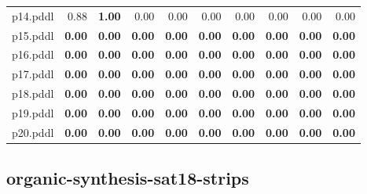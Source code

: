 \documentclass{article}
\begin{document}
\begin{tabular}{@{}lrrrrrrrrr@{}}
p14.pddl & 0.88 & \textbf{1.00} & 0.00 & 0.00 & 0.00 & 0.00 & 0.00 & 0.00 & 0.00 \\
p15.pddl & \textbf{0.00} & \textbf{0.00} & \textbf{0.00} & \textbf{0.00} & \textbf{0.00} & \textbf{0.00} & \textbf{0.00} & \textbf{0.00} & \textbf{0.00} \\
p16.pddl & \textbf{0.00} & \textbf{0.00} & \textbf{0.00} & \textbf{0.00} & \textbf{0.00} & \textbf{0.00} & \textbf{0.00} & \textbf{0.00} & \textbf{0.00} \\
p17.pddl & \textbf{0.00} & \textbf{0.00} & \textbf{0.00} & \textbf{0.00} & \textbf{0.00} & \textbf{0.00} & \textbf{0.00} & \textbf{0.00} & \textbf{0.00} \\
p18.pddl & \textbf{0.00} & \textbf{0.00} & \textbf{0.00} & \textbf{0.00} & \textbf{0.00} & \textbf{0.00} & \textbf{0.00} & \textbf{0.00} & \textbf{0.00} \\
p19.pddl & \textbf{0.00} & \textbf{0.00} & \textbf{0.00} & \textbf{0.00} & \textbf{0.00} & \textbf{0.00} & \textbf{0.00} & \textbf{0.00} & \textbf{0.00} \\
p20.pddl & \textbf{0.00} & \textbf{0.00} & \textbf{0.00} & \textbf{0.00} & \textbf{0.00} & \textbf{0.00} & \textbf{0.00} & \textbf{0.00} & \textbf{0.00} \\
\end{tabular}

\hypertarget{quality-organic-synthesis-sat18-strips}{}
\subsection*{organic-synthesis-sat18-strips}
\end{document}
